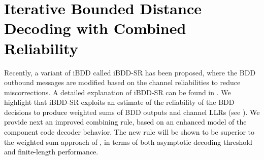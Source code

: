 \documentclass[journal]{IEEEtran}
\newcommand{\GL}{\textcolor{black}}
\begin{document}
\section{\GL{Iterative Bounded Distance Decoding with Combined Reliability}}\label{iBDD-SRPC}  

Recently, a variant of iBDD called iBDD-SR has been proposed, where the BDD  outbound messages are modified based on the channel reliabilities to reduce  miscorrections. A detailed explanation of iBDD-SR can be found in \cite{sheikhTCOM19}. We highlight that iBDD-SR \GL{exploits an estimate of the} reliability of the BDD decisions \GL{to produce}  weighted sums of BDD outputs and channel \GL{LLRs} (see \cite[Fig.~2]{sheikhTCOM19}). \GL{We provide next an improved combining rule, based on an enhanced model of the component code decoder behavior. The new rule will be shown to be superior to the weighted sum approach of \cite{sheikhTCOM19}, in terms of both asymptotic decoding threshold and finite-length performance.} 
\end{document}
